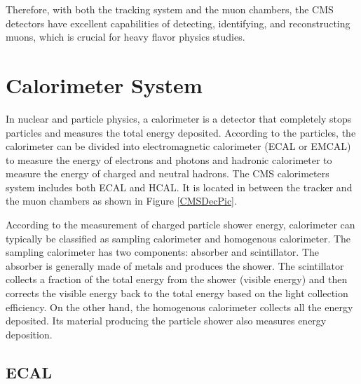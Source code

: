 
Therefore, with both the tracking system and the muon chambers, the CMS detectors have excellent capabilities of detecting, identifying, and reconstructing muons, which is crucial for heavy flavor physics studies.

\section{Calorimeter System}

In nuclear and particle physics, a calorimeter is a detector that completely stops particles and measures the total energy deposited. According to the particles, the calorimeter can be divided into electromagnetic calorimeter (ECAL or EMCAL) to measure the energy of electrons and photons and hadronic calorimeter to measure the energy of charged and neutral hadrons. The CMS calorimeters system includes both ECAL and HCAL. It is located in between the tracker and the muon chambers as shown in Figure \ref{CMSDecPic}. 

According to the measurement of charged particle shower energy, calorimeter can typically be classified as sampling calorimeter and homogenous calorimeter. The sampling calorimeter has two components: absorber and scintillator. The absorber is generally made of metals and produces the shower. The scintillator collects a fraction of the total energy from the shower (visible energy) and then corrects the visible energy back to the total energy based on the light collection efficiency. On the other hand, the homogenous calorimeter collects all the energy deposited. Its material producing the particle shower also measures energy deposition. 

\subsection{ECAL}

